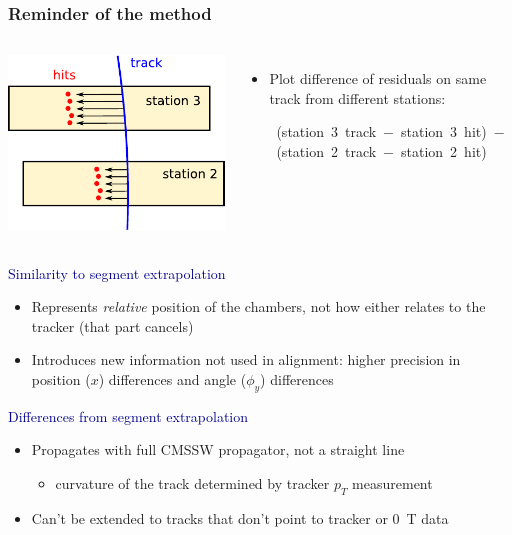 \documentclass[compress]{beamer}
\begin{document}
\begin{frame}
\frametitle{Reminder of the method}

\begin{columns}
\includegraphics[width=\linewidth]{residuals_difference.pdf}

\begin{itemize}
\item Plot difference of residuals on same track from different
  stations:

\mbox{\hspace{-1.3 cm} \scriptsize (station~3 track $-$ station~3 hit) $-$ (station~2 track $-$ station~2 hit)}
\end{itemize}
\end{columns}

\vfill
\textcolor{darkblue}{\large Similarity to segment extrapolation}

\begin{itemize}
\item Represents {\it relative} position of the chambers, not how either relates to the tracker (that part cancels)
\item Introduces new information not used in alignment: higher precision in position ($x$) differences and angle ($\phi_y$) differences
\end{itemize}

\vfill
\textcolor{darkblue}{\large Differences from segment extrapolation}

\begin{itemize}
\item Propagates with full CMSSW propagator, not a straight line
\begin{itemize}
\item curvature of the track determined by tracker $p_T$ measurement
\end{itemize}
\item Can't be extended to tracks that don't point to tracker or 0~T data
\end{itemize}
\end{frame}
\end{document}
